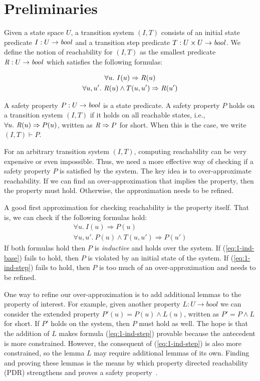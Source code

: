 \section{Preliminaries}
\label{sec:background}

Given a state space $U$, a transition system $(I,T)$ consists of an
initial state predicate $ I : U \to \mathit{bool} $ and a transition step
predicate $ T : U \times U \to \mathit{bool} $.
We define the notion of
reachability for $(I, T)$ as the smallest predicate $\mathit{R} : U \to
\mathit{bool}$ which satisfies the following formulas:

\begin{gather*}
  \forall u.~ I(u) \Rightarrow \mathit{R}(u) \\
  \forall u, u'.~ \mathit{R}(u) \land T(u, u') \Rightarrow \mathit{R}(u')
\end{gather*}

A safety property $P : U \to \mathit{bool}$ is a state predicate. A safety
property $P$ holds on a transition system $(I, T)$ if it holds on all
reachable states, i.e., $\forall u.~ \mathit{R}(u) \Rightarrow P(u)$,
written as $\mathit{R} \Rightarrow P$ for short. When this is the case, we
write $(I, T)\vdash P$.

For an arbitrary transition system $(I, T)$, computing reachability
can be very expensive or even impossible. Thus, we need a more
effective way of checking if a safety property $P$ is satisfied by the
system. The key idea is to over-approximate reachability. If we can
find an over-approximation that implies the property, then the
property must hold. Otherwise, the approximation needs to be refined.

A good first approximation for checking reachability is the property itself.
That is, we can check if the following formulas hold:
\begin{gather}
  \forall u.~ I(u) \Rightarrow P(u)
  \label{eq:1-ind-base} \\
  \forall u, u'.~ P(u) \land T(u, u') \Rightarrow P(u')
  \label{eq:1-ind-step}
\end{gather}
If both formulas hold then $P$ is {\em inductive} and holds over the
system. If (\ref{eq:1-ind-base}) fails to hold, then $P$ is violated
by an initial state of the system. If (\ref{eq:1-ind-step}) fails to
hold, then $P$ is too much of an over-approximation and needs to be
refined.

One way to refine our over-approximation is to add additional lemmas
to the property of interest. For example, given another property $L :
U \to bool$ we can consider the extended property $P'(u) = P(u) \land
L(u)$, written as $P' = P \land L$ for short. If $P'$ holds on the
system, then $P$ must hold as well. The hope is that the addition of
$L$ makes formula (\ref{eq:1-ind-step}) provable because the
antecedent is more constrained. However, the consequent of
(\ref{eq:1-ind-step}) is also more constrained, so the lemma $L$ may
require additional lemmas of its own. Finding and proving these
lemmas is the means by which property directed reachability (PDR)
strengthens and proves a safety property~\cite{Een2011:PDR}.

